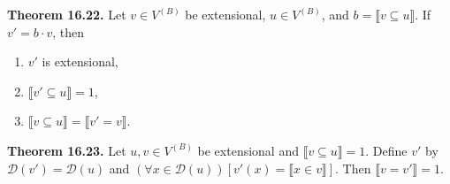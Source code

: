 \textbf{Theorem 16.22.} Let $v \in V^{(B)}$ be extensional, $u \in V^{(B)}$, and $b = \llbracket v \subseteq u \rrbracket$. If $v' = b \cdot v$, then
\begin{enumerate}
\item $v'$ is extensional,
\item $\llbracket v' \subseteq u \rrbracket = 1$,
\item $\llbracket v \subseteq u \rrbracket = \llbracket v' = v \rrbracket$.
\end{enumerate}

\textbf{Theorem 16.23.} Let $u, v \in V^{(B)}$ be extensional and $\llbracket v \subseteq u \rrbracket = 1$. Define $v'$ by $\mathcal{D}(v') = \mathcal{D}(u)$ and $(\forall x \in \mathcal{D}(u))[v'(x) = \llbracket x \in v \rrbracket]$. Then $\llbracket v = v' \rrbracket = 1$.
